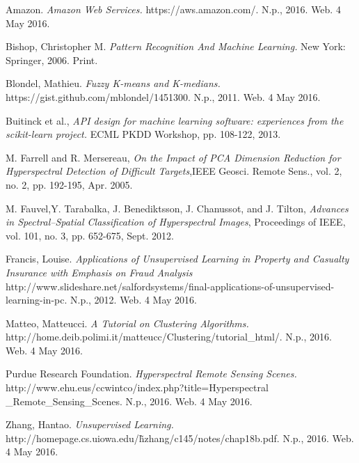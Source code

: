 \documentclass[journal]{IEEEtran}
\begin{document}
\begin{thebibliography}{1}

  Amazon. \emph{Amazon Web Services.} https://aws.amazon.com/. N.p., 2016. Web. 4 May 2016.

  Bishop, Christopher M. \emph{Pattern Recognition And Machine Learning.} New York: Springer, 2006. Print.

  Blondel, Mathieu. \emph{Fuzzy K-means and K-medians.} https://gist.github.com/mblondel/1451300. N.p., 2011. Web. 4 May 2016.

  Buitinck et al., \emph{API design for machine learning software: experiences from the scikit-learn project.} ECML PKDD Workshop, pp. 108-122, 2013.

  M. Farrell and R. Mersereau, \emph{On the Impact of PCA Dimension Reduction for Hyperspectral Detection of Difficult Targets},IEEE Geosci. Remote Sens., vol. 2, no. 2, pp. 192-195, Apr. 2005.

  M. Fauvel,Y. Tarabalka, J. Benediktsson, J. Chanussot, and J. Tilton, \emph{Advances in Spectral–Spatial Classification of Hyperspectral Images}, Proceedings of IEEE, vol. 101, no. 3, pp. 652-675, Sept. 2012.

  Francis, Louise. \emph{Applications of Unsupervised Learning in Property and Casualty Insurance with Emphasis on Fraud Analysis} http://www.slideshare.net/salfordsystems/final-applications-of-unsupervised-learning-in-pc. N.p., 2012. Web. 4 May 2016.

  Matteo, Matteucci. \emph{A Tutorial on Clustering Algorithms.} http://home.deib.polimi.it/matteucc/Clustering/tutorial\_html/. N.p., 2016. Web. 4 May 2016.

  Purdue Research Foundation. \emph{Hyperspectral Remote Sensing Scenes.} http://www.ehu.eus/ccwintco/index.php?title=Hyperspectral \_Remote\_Sensing\_Scenes. N.p., 2016. Web. 4 May 2016.

  Zhang, Hantao. \emph{Unsupervised Learning.} http://homepage.cs.uiowa.edu/\~hzhang/c145/notes/chap18b.pdf. N.p., 2016. Web. 4 May 2016.

\end{thebibliography}
\end{document}

